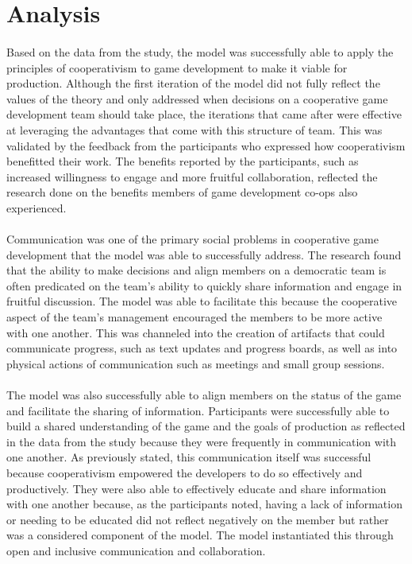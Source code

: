\section{Analysis}

\paragraph{} Based on the data from the study, the model was successfully able to apply the principles of cooperativism to game development to make it viable for production. Although the first iteration of the model did not fully reflect the values of the theory and only addressed when decisions on a cooperative game development team should take place, the iterations that came after were effective at leveraging the advantages that come with this structure of team. This was validated by the feedback from the participants who expressed how cooperativism benefitted their work. The benefits reported by the participants, such as increased willingness to engage and more fruitful collaboration, reflected the research done on the benefits members of game development co-ops also experienced.

\paragraph{} Communication was one of the primary social problems in cooperative game development that the model was able to successfully address. The research found that the ability to make decisions and align members on a democratic team is often predicated on the team's ability to quickly share information and engage in fruitful discussion. The model was able to facilitate this because the cooperative aspect of the team's management encouraged the members to be more active with one another. This was channeled into the creation of artifacts that could communicate progress, such as text updates and progress boards, as well as into physical actions of communication such as meetings and small group sessions.

\paragraph{} The model was also successfully able to align members on the status of the game and facilitate the sharing of information. Participants were successfully able to build a shared understanding of the game and the goals of production as reflected in the data from the study because they were frequently in communication with one another. As previously stated, this communication itself was successful because cooperativism empowered the developers to do so effectively and productively. They were also able to effectively educate and share information with one another because, as the participants noted, having a lack of information or needing to be educated did not reflect negatively on the member but rather was a considered component of the model. The model instantiated this through open and inclusive communication and collaboration.

